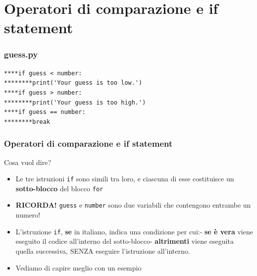 \documentclass{beamer}
\begin{document}
\section{Operatori di comparazione e if statement}

\begin{frame}[fragile]
\frametitle{guess.py}
	\begin{lstlisting}
****if guess < number:
********print('Your guess is too low.')
****if guess > number:
********print('Your guess is too high.')
****if guess == number:
********break
	\end{lstlisting}
\end{frame}

\begin{frame}[fragile]
\frametitle{Operatori di comparazione e if statement}
\begin{block}{Cosa vuol dire?}
	\begin{itemize}
		\item Le tre istruzioni \texttt{if} sono simili tra loro, e ciascuna di esse costituisce un \textbf{sotto-blocco} del blocco \texttt{for}
		\item \textbf{RICORDA!} \texttt{guess} e \texttt{number} sono due variabili che contengono entrambe un numero!
		\item L'istruzione \texttt{if}, \textbf{se} in italiano, indica una condizione per cui:\newline - \textbf{se è vera} viene eseguito il codice all'interno del sotto-blocco\newline - \textbf{altrimenti} viene eseguita quella successiva, SENZA eseguire l'istruzione all'interno.
		\item Vediamo di capire meglio con un esempio
	\end{itemize}
\end{block}
\end{frame}
\end{document}
